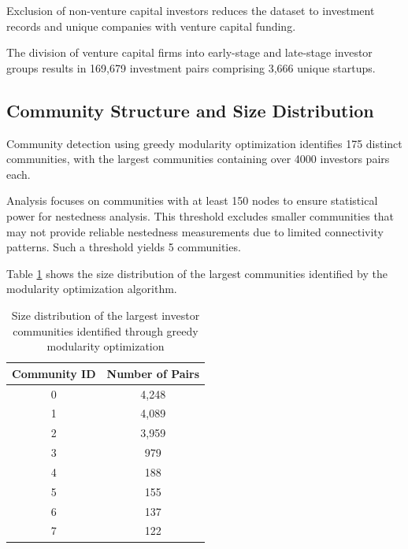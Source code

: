 \documentclass[12pt]{article}
\begin{document}
Exclusion of non-venture capital investors reduces the dataset to \numVCInvestments{} investment records and \numCompaniesWithVCFund{} unique companies with venture capital funding.

\newcommand{\invPairs}{169,679}
\newcommand{\invPairsUniqueStartups}{3,666}

The division of venture capital firms into early-stage and late-stage investor groups results in \invPairs{} investment pairs comprising \invPairsUniqueStartups{} unique startups.


\newcommand{\numCommunities}{175}
\newcommand{\numTopCommunities}{5}
\newcommand{\numCommunitiesThreshold}{150}

\subsection{Community Structure and Size Distribution}

Community detection using greedy modularity optimization identifies \numCommunities{} distinct communities, with the largest communities containing over 4000 investors pairs each.

Analysis focuses on communities with at least \numCommunitiesThreshold{} nodes to ensure statistical power for nestedness analysis. This threshold excludes smaller communities that may not provide reliable nestedness measurements due to limited connectivity patterns. Such a threshold yields \numTopCommunities{} communities.

Table \ref{tab:community_sizes} shows the size distribution of the largest communities identified by the modularity optimization algorithm.


\begin{table}[htbp]
\centering
\begin{tabular}{|c|c|}
\hline
\textbf{Community ID} & \textbf{Number of Pairs} \\
\hline
0 & 4,248 \\
1 & 4,089 \\
2 & 3,959 \\
3 & 979 \\
4 & 188 \\
5 & 155 \\
6 & 137 \\
7 & 122 \\
\hline
\end{tabular}
\caption{Size distribution of the largest investor communities identified through greedy modularity optimization}
\label{tab:community_sizes}
\end{table}
\end{document}
